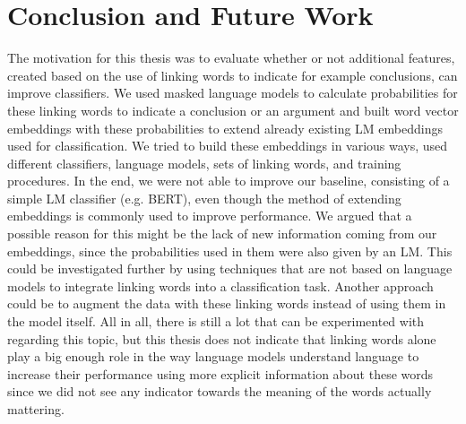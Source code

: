 \section{Conclusion and Future Work}
The motivation for this thesis was to evaluate whether or not additional features, created based on the use of linking words to indicate for example conclusions, can improve classifiers. We used masked language models to calculate probabilities for these linking words to indicate a conclusion or an argument and built word vector embeddings with these probabilities to extend already existing LM embeddings used for classification. We tried to build these embeddings in various ways, used different classifiers, language models, sets of linking words, and training procedures. In the end, we were not able to improve our baseline, consisting of a simple LM classifier (e.g. BERT), even though the method of extending embeddings is commonly used to improve performance. We argued that a possible reason for this might be the lack of new information coming from our embeddings, since the probabilities used in them were also given by an LM. This could be investigated further by using techniques that are not based on language models to integrate linking words into a classification task. Another approach could be to augment the data with these linking words instead of using them in the model itself. All in all, there is still a lot that can be experimented with regarding this topic, but this thesis does not indicate that linking words alone play a big enough role in the way language models understand language to increase their performance using more explicit information about these words since we did not see any indicator towards the meaning of the words actually mattering.